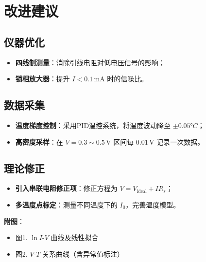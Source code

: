 \documentclass[12pt,a4paper]{article}
\begin{document}
\section{改进建议}

\subsection{仪器优化}

\begin{itemize}
\item \textbf{四线制测量}：消除引线电阻对低电压信号的影响；
\item \textbf{锁相放大器}：提升 $I < 0.1 \, \text{mA}$ 时的信噪比。
\end{itemize}

\subsection{数据采集}

\begin{itemize}
\item \textbf{温度梯度控制}：采用PID温控系统，将温度波动降至 $\pm 0.05°C$；
\item \textbf{高密度采样}：在 $V = 0.3 \sim 0.5 \, \text{V}$ 区间每 $0.01 \, \text{V}$ 记录一次数据。
\end{itemize}

\subsection{理论修正}

\begin{itemize}
\item \textbf{引入串联电阻修正项}：修正方程为 $V = V_{\text{ideal}} + I R_s$；
\item \textbf{多温度点标定}：测量不同温度下的 $I_0$，完善温度模型。
\end{itemize}

\textbf{附图}：
\begin{itemize}
\item 图1. $\ln I$-$V$ 曲线及线性拟合
\item 图2. $V$-$T$ 关系曲线（含异常值标注）
\end{itemize}
\end{document}

